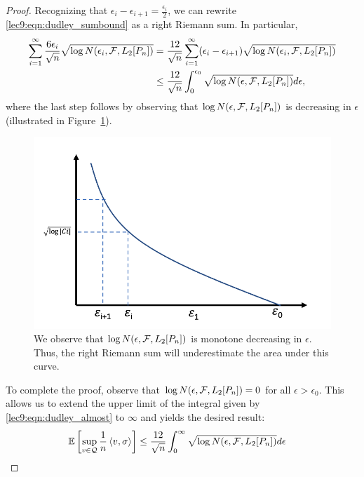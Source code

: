 \begin{proof}
    Recognizing that $\epsilon_i - \epsilon_{i + 1} = \frac{\epsilon_i}{2}$, we can rewrite \eqref{lec9:eqn:dudley_sumbound} as a right Riemann sum. In particular,
    \begin{align}
        \sum_{i = 1}^\infty \frac{6 \epsilon_i}{\sqrt{n}}\sqrt{\log N(\epsilon_i, \mathcal F, L_2[P_n])} &= \frac{12}{\sqrt{n}} \sum_{i = 1}^\infty (\epsilon_i - \epsilon_{i + 1}) \sqrt{\log N(\epsilon_i, \mathcal F, L_2[P_n])} \\
        &\le \frac{12}{\sqrt{n}} \int_{0}^{\epsilon_0} \sqrt{\log N(\epsilon, \mathcal F, L_2[P_n])} d\epsilon, \label{lec9:eqn:dudley_almost}
    \end{align}
    where the last step follows by observing that $\log N(\epsilon, \mathcal F, L_2[P_n])$ is decreasing in $\epsilon$ (illustrated in Figure~\ref{lec9:fig:chaining_riemann}).

    \begin{figure}[h!]
        \begin{center}
            \includegraphics[width=.6\textwidth]{figures/chaining_riemann.png}
        \end{center}
        \caption{We observe that $\log N(\epsilon, \mathcal F, L_2[P_n])$ is monotone decreasing in $\epsilon$. Thus, the right Riemann sum will underestimate the area under this curve.}
        \label{lec9:fig:chaining_riemann}
    \end{figure}    

    To complete the proof, observe that $\log N(\epsilon, \mathcal F, L_2[P_n]) = 0$ for all $\epsilon > \epsilon_0$. This allows us to extend the upper limit of the integral given by \eqref{lec9:eqn:dudley_almost} to $\infty$ and yields the desired result:
    \begin{align}
        \operatorname*{\mathbb{E}}\left[\sup_{v \in \mathcal Q} \frac 1 n \left\langle v, \sigma\right\rangle \right] & \le \frac{12}{\sqrt{n}} \int_{0}^\infty \sqrt{\log N(\epsilon, \mathcal F, L_2[P_n])} d\epsilon
    \end{align}
\end{proof}

